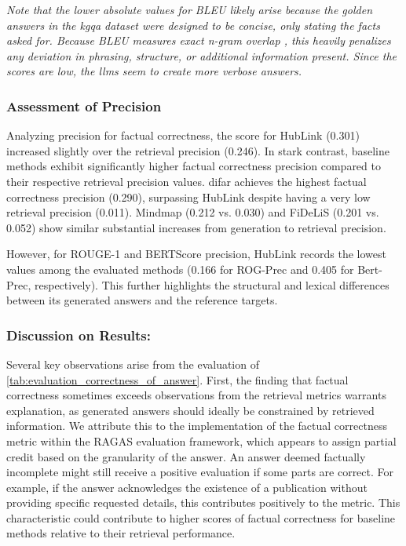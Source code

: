 \textit{Note that the lower absolute values for BLEU likely arise because the golden answers in the \gls{kgqa} dataset were designed to be concise, only stating the facts asked for. Because BLEU measures exact n-gram overlap \cite{papineni_bleu_2001}, this heavily penalizes any deviation in phrasing, structure, or additional information present. Since the scores are low, the \glspl{llm} seem to create more verbose answers.}

\subsubsection{Assessment of Precision}

Analyzing precision for factual correctness, the score for HubLink (0.301) increased slightly over the retrieval precision (0.246). In stark contrast, baseline methods exhibit significantly higher factual correctness precision compared to their respective retrieval precision values. \gls{difar} achieves the highest factual correctness precision (0.290), surpassing HubLink despite having a very low retrieval precision (0.011). Mindmap (0.212 vs. 0.030) and FiDeLiS (0.201 vs. 0.052) show similar substantial increases from generation to retrieval precision.

However, for ROUGE-1 and BERTScore precision, HubLink records the lowest values among the evaluated methods (0.166 for ROG-Prec and 0.405 for Bert-Prec, respectively). This further highlights the structural and lexical differences between its generated answers and the reference targets.

\subsubsection{Discussion on Results:} 

Several key observations arise from the evaluation of \autoref{tab:evaluation_correctness_of_answer}. First, the finding that factual correctness sometimes exceeds observations from the retrieval metrics warrants explanation, as generated answers should ideally be constrained by retrieved information. We attribute this to the implementation of the factual correctness metric within the RAGAS evaluation framework, which appears to assign partial credit based on the granularity of the answer. An answer deemed factually incomplete might still receive a positive evaluation if some parts are correct. For example, if the answer acknowledges the existence of a publication without providing specific requested details, this contributes positively to the metric. This characteristic could contribute to higher scores of factual correctness for baseline methods relative to their retrieval performance.


